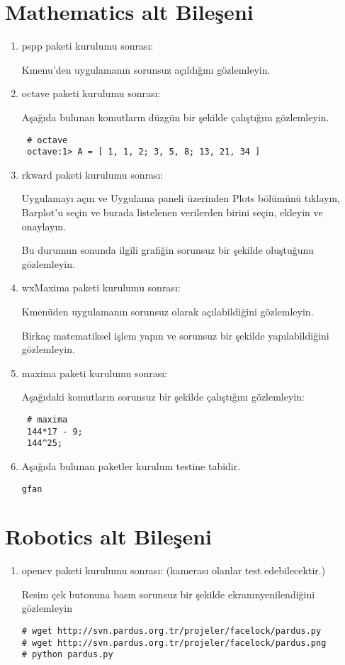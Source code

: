 \documentclass[a4paper,10pt]{article}
\begin{document}
\section{Mathematics alt Bileşeni}
\begin{enumerate}
\item pspp paketi kurulumu sonrası:

Kmenu'den uygulamanın sorunsuz açıldığını gözlemleyin.
\item octave paketi kurulumu sonrası:

Aşağıda bulunan komutların düzgün bir şekilde çalıştığını gözlemleyin.
\begin{verbatim}
 # octave 
 octave:1> A = [ 1, 1, 2; 3, 5, 8; 13, 21, 34 ]
\end{verbatim}


\item rkward paketi kurulumu sonrası:

Uygulamayı açın ve Uygulama paneli üzerinden Plots bölümünü tıklayın, Barplot'u seçin ve burada listelenen verilerden birini seçin, ekleyin ve onaylayın. 

Bu durumun sonunda ilgili grafiğin sorunsuz bir şekilde oluştuğunu gözlemleyin.

\item wxMaxima paketi kurulumu sonrası:

Kmenüden uygulamanın sorunsuz olarak açılabildiğini gözlemleyin.

Birkaç matematiksel işlem yapın ve sorunsuz bir şekilde yapılabildiğini gözlemleyin.
\item maxima paketi kurulumu sonrası:

Aşağıdaki komutların sorunsuz bir şekilde çalıştığını gözlemleyin:
\begin{verbatim}
 # maxima
 144*17 - 9;
 144^25;
\end{verbatim}

\item Aşağıda bulunan paketler kurulum testine tabidir.
\begin{verbatim}
gfan 
\end{verbatim}

\end{enumerate}

\section{Robotics alt Bileşeni}
\begin{enumerate}
 \item opencv paketi kurulumu sonrası: (kamerası olanlar test edebilecektir.)

Resim çek butonuna basın sorunsuz bir şekilde ekranınyenilendiğini gözlemleyin
\begin{verbatim}
# wget http://svn.pardus.org.tr/projeler/facelock/pardus.py
# wget http://svn.pardus.org.tr/projeler/facelock/pardus.png
# python pardus.py
\end{verbatim}


\end{enumerate}
\end{document}
